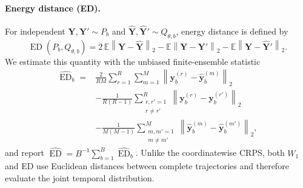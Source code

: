 \paragraph{Energy distance (ED).}
For independent $\mathbf Y,\mathbf Y'\sim P_b$ and
$\widehat{\mathbf Y},\widehat{\mathbf Y}'\sim Q_{\theta,b}$, energy distance is
defined by \citep{szekely2013energy}
\begin{equation}
  \operatorname{ED}(P_b,Q_{\theta,b})
  =
  2\,\mathbb{E}\left\|\mathbf Y-\widehat{\mathbf Y}\right\|_2
  -\mathbb{E}\left\|\mathbf Y-\mathbf Y'\right\|_2
  -\mathbb{E}\left\|\widehat{\mathbf Y}-\widehat{\mathbf Y}'\right\|_2.
  \label{eq:energy-distance}
\end{equation}
We estimate this quantity with the unbiased finite-ensemble statistic
\begin{align}
  \widehat{\operatorname{ED}}_b
  ={}&
  \frac{2}{RM}\sum_{r=1}^{R}\sum_{m=1}^{M}
  \left\|\mathbf y_b^{(r)}-\widehat{\mathbf y}_b^{(m)}\right\|_2
  \nonumber\\
  &-
  \frac{1}{R(R-1)}
  \sum_{\substack{r,r'=1\\r\neq r'}}^{R}
  \left\|\mathbf y_b^{(r)}-\mathbf y_b^{(r')}\right\|_2
  \nonumber\\
  &-
  \frac{1}{M(M-1)}
  \sum_{\substack{m,m'=1\\m\neq m'}}^{M}
  \left\|\widehat{\mathbf y}_b^{(m)}-
  \widehat{\mathbf y}_b^{(m')}\right\|_2,
  \label{eq:energy-distance-ensemble}
\end{align}
and report
$\widehat{\operatorname{ED}}=B^{-1}\sum_{b=1}^{B}
\widehat{\operatorname{ED}}_b$.
Unlike the coordinatewise CRPS, both $W_1$ and ED use Euclidean distances
between complete trajectories and therefore evaluate the joint temporal
distribution.


